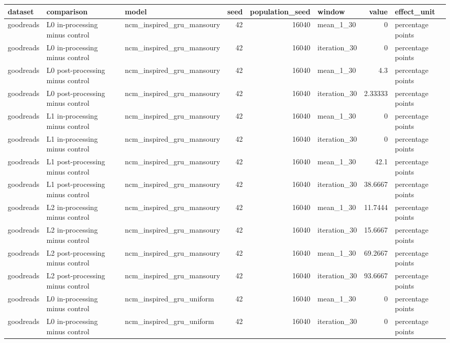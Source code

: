 \begin{table}[htbp!]
\centering
\small
\setlength{\tabcolsep}{3pt}
\renewcommand{\arraystretch}{1.1}
\begin{tabular}{lllrrlrl}
\hline
dataset & comparison & model & seed & population\_seed & window & value & effect\_unit \\
\hline
goodreads & L0 in-processing minus control & ncm\_inspired\_gru\_mansoury & 42 & 16040 & mean\_1\_30 & 0 & percentage points \\
goodreads & L0 in-processing minus control & ncm\_inspired\_gru\_mansoury & 42 & 16040 & iteration\_30 & 0 & percentage points \\
goodreads & L0 post-processing minus control & ncm\_inspired\_gru\_mansoury & 42 & 16040 & mean\_1\_30 & 4.3 & percentage points \\
goodreads & L0 post-processing minus control & ncm\_inspired\_gru\_mansoury & 42 & 16040 & iteration\_30 & 2.33333 & percentage points \\
goodreads & L1 in-processing minus control & ncm\_inspired\_gru\_mansoury & 42 & 16040 & mean\_1\_30 & 0 & percentage points \\
goodreads & L1 in-processing minus control & ncm\_inspired\_gru\_mansoury & 42 & 16040 & iteration\_30 & 0 & percentage points \\
goodreads & L1 post-processing minus control & ncm\_inspired\_gru\_mansoury & 42 & 16040 & mean\_1\_30 & 42.1 & percentage points \\
goodreads & L1 post-processing minus control & ncm\_inspired\_gru\_mansoury & 42 & 16040 & iteration\_30 & 38.6667 & percentage points \\
goodreads & L2 in-processing minus control & ncm\_inspired\_gru\_mansoury & 42 & 16040 & mean\_1\_30 & 11.7444 & percentage points \\
goodreads & L2 in-processing minus control & ncm\_inspired\_gru\_mansoury & 42 & 16040 & iteration\_30 & 15.6667 & percentage points \\
goodreads & L2 post-processing minus control & ncm\_inspired\_gru\_mansoury & 42 & 16040 & mean\_1\_30 & 69.2667 & percentage points \\
goodreads & L2 post-processing minus control & ncm\_inspired\_gru\_mansoury & 42 & 16040 & iteration\_30 & 93.6667 & percentage points \\
goodreads & L0 in-processing minus control & ncm\_inspired\_gru\_uniform & 42 & 16040 & mean\_1\_30 & 0 & percentage points \\
goodreads & L0 in-processing minus control & ncm\_inspired\_gru\_uniform & 42 & 16040 & iteration\_30 & 0 & percentage points \\

\end{tabular}
\end{table}
